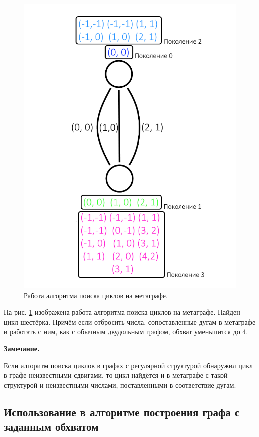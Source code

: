 \documentclass[14pt]{mmcs_article}
\begin{document}
\begin{figure}[H]
  \centering
  \includegraphics[scale=0.5]{Fig_9.png}
  \caption{ Работа алгоритма поиска циклов на метаграфе. }
  \label{stud:metagraph:2}
\end{figure}

На рис. \ref{stud:metagraph:2} изображена работа алгоритма поиска циклов на метаграфе. Найден цикл-шестёрка. Причём если отбросить числа, сопоставленные дугам в метаграфе и работать с ним, как с обычным двудольным графом, обхват уменьшится до 4.

\textbf{Замечание.}

Если алгоритм поиска циклов в графах с регулярной структурой обнаружил цикл в графе неизвестными сдвигами, то цикл найдётся и в метаграфе с такой структурой и неизвестными числами, поставленными в соответствие дугам.

\subsection{Использование в алгоритме построения графа с заданным обхватом}
\end{document}
